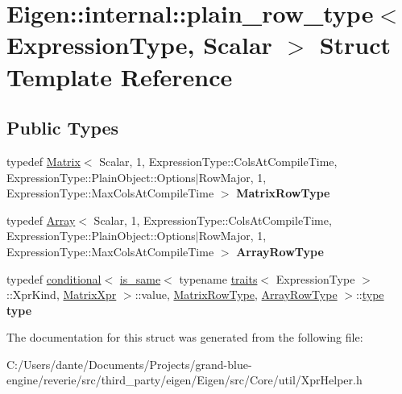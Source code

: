 \hypertarget{struct_eigen_1_1internal_1_1plain__row__type}{}\section{Eigen\+::internal\+::plain\+\_\+row\+\_\+type$<$ Expression\+Type, Scalar $>$ Struct Template Reference}
\label{struct_eigen_1_1internal_1_1plain__row__type}
\subsection*{Public Types}
\begin{DoxyCompactItemize}
\item 
\mbox{\label{struct_eigen_1_1internal_1_1plain__row__type_a499e20b59c8b2a229039780dc9fb6ced}} 
typedef \mbox{\hyperlink{class_eigen_1_1_matrix}{Matrix}}$<$ Scalar, 1, Expression\+Type\+::\+Cols\+At\+Compile\+Time, Expression\+Type\+::\+Plain\+Object\+::\+Options$\vert$Row\+Major, 1, Expression\+Type\+::\+Max\+Cols\+At\+Compile\+Time $>$ {\bfseries Matrix\+Row\+Type}
\item 
\mbox{\label{struct_eigen_1_1internal_1_1plain__row__type_abff896fa5a71cc838b47e38bd58bb561}} 
typedef \mbox{\hyperlink{class_eigen_1_1_array}{Array}}$<$ Scalar, 1, Expression\+Type\+::\+Cols\+At\+Compile\+Time, Expression\+Type\+::\+Plain\+Object\+::\+Options$\vert$Row\+Major, 1, Expression\+Type\+::\+Max\+Cols\+At\+Compile\+Time $>$ {\bfseries Array\+Row\+Type}
\item 
\mbox{\label{struct_eigen_1_1internal_1_1plain__row__type_afd854af5b54f4843ccb5d712fcadd462}} 
typedef \mbox{\hyperlink{struct_eigen_1_1internal_1_1conditional}{conditional}}$<$ \mbox{\hyperlink{struct_eigen_1_1internal_1_1is__same}{is\+\_\+same}}$<$ typename \mbox{\hyperlink{struct_eigen_1_1internal_1_1traits}{traits}}$<$ Expression\+Type $>$\+::Xpr\+Kind, \mbox{\hyperlink{struct_eigen_1_1_matrix_xpr}{Matrix\+Xpr}} $>$\+::value, \mbox{\hyperlink{class_eigen_1_1_matrix}{Matrix\+Row\+Type}}, \mbox{\hyperlink{class_eigen_1_1_array}{Array\+Row\+Type}} $>$\+::\mbox{\hyperlink{struct_eigen_1_1internal_1_1true__type}{type}} {\bfseries type}
\end{DoxyCompactItemize}


The documentation for this struct was generated from the following file\+:\begin{DoxyCompactItemize}
\item 
C\+:/\+Users/dante/\+Documents/\+Projects/grand-\/blue-\/engine/reverie/src/third\+\_\+party/eigen/\+Eigen/src/\+Core/util/Xpr\+Helper.\+h\end{DoxyCompactItemize}

